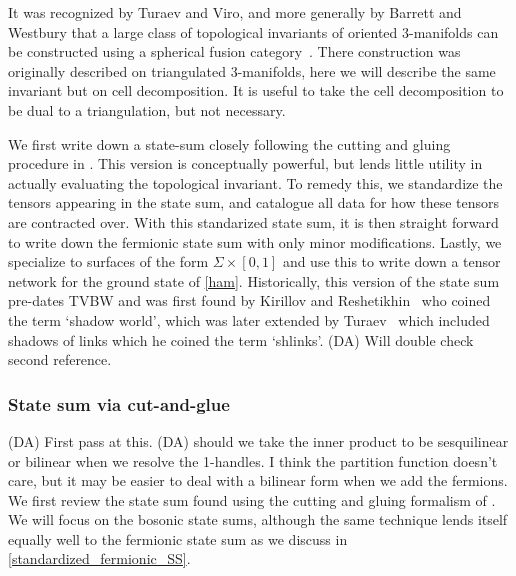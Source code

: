 \documentclass[12pt,a4paper]{article}
\newcommand{\dave}[1]{{\color{ao(english)}\footnotesize{(DA) #1}}}
\begin{document}
It was recognized by Turaev and Viro, and more generally by Barrett and Westbury that a large class of topological invariants of oriented 3-manifolds
can be constructed using a spherical fusion category~\cite{Turaev1992,Barrett1996}.
There construction was originally described on triangulated 3-manifolds, 
here we will describe the same invariant but on cell decomposition.
It is useful to take the cell decomposition to be dual to a triangulation, 
but not necessary. 

We first write down a state-sum closely following the cutting and gluing procedure in \cite{Walker2006}. 
This version is conceptually powerful, 
but lends little utility in actually evaluating the topological invariant. 
To remedy this, we standardize the tensors appearing in the state sum, 
and catalogue all data for how these tensors are contracted over.
With this standarized state sum, 
it is then straight forward to write down the fermionic state sum with only minor modifications. 
Lastly, we specialize to surfaces of the form $\Sigma \times [0,1]$ 
and use this to write down a tensor network for the ground state of \eqref{ham}. 
Historically, this version of the state sum pre-dates TVBW and was first found by Kirillov and Reshetikhin~\cite{Kirillow1989} who coined the term `shadow world', which was later extended by Turaev~\cite{turaev1992shadow} which included shadows of links which he coined the term `shlinks'.
\dave{Will double check second reference.}


\subsubsection{State sum via cut-and-glue}
\dave{First pass at this.}
\dave{should we take the inner product to be sesquilinear or bilinear when we resolve the 1-handles.
I think the partition function doesn't care, 
but it may be easier to deal with a bilinear form when we add the fermions. }
We first review the state sum found using the cutting and gluing formalism of \cite{Walker2006}. 
We will focus on the bosonic state sums, 
although the same technique lends itself equally well to the fermionic state sum as we discuss in \ref{standardized_fermionic_SS}.
\end{document}
